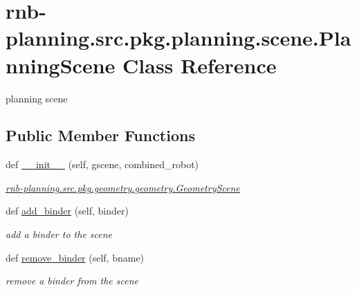 \hypertarget{classrnb-planning_1_1src_1_1pkg_1_1planning_1_1scene_1_1_planning_scene}{}\section{rnb-\/planning.src.\+pkg.\+planning.\+scene.\+Planning\+Scene Class Reference}
\label{classrnb-planning_1_1src_1_1pkg_1_1planning_1_1scene_1_1_planning_scene}


planning scene  


\subsection*{Public Member Functions}
\begin{DoxyCompactItemize}
\item 
def \hyperlink{classrnb-planning_1_1src_1_1pkg_1_1planning_1_1scene_1_1_planning_scene_a10c03811b4653bdb2b9bd259f8b598c1}{\+\_\+\+\_\+init\+\_\+\+\_\+} (self, gscene, combined\+\_\+robot)
\begin{DoxyCompactList}\small\item\em \hyperlink{classrnb-planning_1_1src_1_1pkg_1_1geometry_1_1geometry_1_1_geometry_scene}{rnb-\/planning.\+src.\+pkg.\+geometry.\+geometry.\+Geometry\+Scene} \end{DoxyCompactList}\item 
\mbox{\label{classrnb-planning_1_1src_1_1pkg_1_1planning_1_1scene_1_1_planning_scene_a1ccb14230b2d42de2295e67f36b9c492}} 
def \hyperlink{classrnb-planning_1_1src_1_1pkg_1_1planning_1_1scene_1_1_planning_scene_a1ccb14230b2d42de2295e67f36b9c492}{add\+\_\+binder} (self, binder)
\begin{DoxyCompactList}\small\item\em add a binder to the scene \end{DoxyCompactList}\item 
\mbox{\label{classrnb-planning_1_1src_1_1pkg_1_1planning_1_1scene_1_1_planning_scene_ac90f151eb0991d7bce9d4f582c991069}} 
def \hyperlink{classrnb-planning_1_1src_1_1pkg_1_1planning_1_1scene_1_1_planning_scene_ac90f151eb0991d7bce9d4f582c991069}{remove\+\_\+binder} (self, bname)
\begin{DoxyCompactList}\small\item\em remove a binder from the scene \end{DoxyCompactList}\item 

\end{DoxyCompactItemize}
